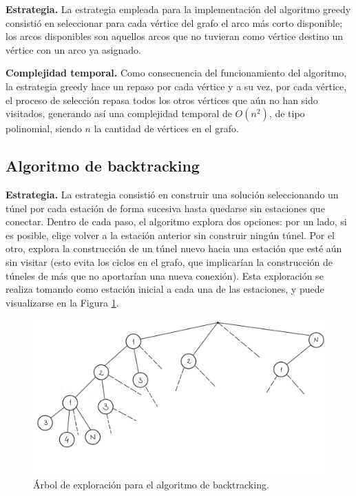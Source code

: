 \documentclass[10 pt, A4paper]{article}
\begin{document}
	\textbf{Estrategia.} La estrategia empleada para la implementación del algoritmo greedy consistió en seleccionar para cada vértice del grafo el arco más corto disponible; los arcos disponibles son aquellos arcos que no tuvieran como vértice destino un vértice con un arco ya asignado.
	
	\textbf{Complejidad temporal.} Como consecuencia del funcionamiento del algoritmo, la estrategia greedy hace un repaso por cada vértice y a su vez, por cada vértice, el proceso de selección repasa todos los otros vértices que aún no han sido visitados, generando así una complejidad temporal de $O(n^2)$, de tipo polinomial, siendo $n$ la cantidad de vértices en el grafo.
	
	\subsection*{Algoritmo de backtracking}

	\textbf{Estrategia.} La estrategia consistió en construir una solución seleccionando un túnel por cada estación de forma sucesiva hasta quedarse sin estaciones que conectar. Dentro de cada paso, el algoritmo explora dos opciones: por un lado, si es posible, elige volver a la estación anterior sin construir ningún túnel. Por el otro, explora la construcción de un túnel nuevo hacia una estación que esté aún sin visitar (esto evita los ciclos en el grafo, que implicarían la construcción de túneles de más que no aportarían una nueva conexión). Esta exploración se realiza tomando como estación inicial a cada una de las estaciones, y puede visualizarse en la Figura \ref{tree}.
	
	\begin{figure}[h]
		\centering
		\includegraphics[scale = 0.18]{Árbol de exploración.png}
		\caption{Árbol de exploración para el algoritmo de backtracking.}
		\label{tree}
	\end{figure}
	
\end{document}
